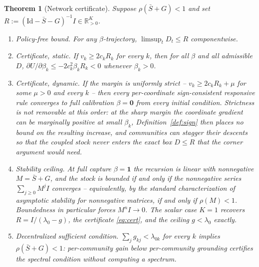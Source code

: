 \documentclass[11pt]{article}
\newtheorem{theorem}{Theorem}[section]
\theoremstyle{definition}
\theoremstyle{remark}
\numberwithin{equation}{section}
\newcommand{\R}{\mathbb{R}}
\begin{document}
\begin{theorem}[Network certificate]\label{thm:network}
Suppose $\rho(\bar S+G)<1$ and set $R:=(\mathrm{Id}-\bar S-G)^{-1}I\in\R^K_{>0}$.
\begin{enumerate}
\item[(i)] \emph{Policy-free bound.} For any $\beta$-trajectory, $\limsup_t D_t\le R$ componentwise.
\item[(ii)] \emph{Certificate, static.} If $v_k\ge 2c_kR_k$ for every $k$, then for all $\beta$ and all admissible $D$, $\partial U/\partial\beta_k\le-2c_k^2\beta_kR_k<0$ whenever $\beta_k>0$.
\item[(ii$'$)] \emph{Certificate, dynamic.} If the margin is \emph{uniformly strict} -- $v_k\ge 2c_kR_k+\mu$ for some $\mu>0$ and every $k$ -- then every per-coordinate sign-consistent responsive rule converges to full calibration $\beta=\mathbf{0}$ from every initial condition. Strictness is not removable at this order: at the sharp margin the coordinate gradient can be marginally positive at small $\beta_k$, Definition~\ref{def:sign} then places no bound on the resulting increase, and communities can stagger their descents so that the coupled stock never enters the exact box $D\le R$ that the corner argument would need.
\item[(iii)] \emph{Stability ceiling.} At full capture $\beta=\mathbf{1}$ the recursion is linear with nonnegative $M=\bar S+G$, and the stock is bounded if and only if the nonnegative series $\sum_{j\ge0}M^jI$ converges -- equivalently, by the standard characterization of asymptotic stability for nonnegative matrices, if and only if $\rho(M)<1$. Boundedness in particular forces $M^nI\to0$. The scalar case $K=1$ recovers $R=I/(\lambda_0-g)$, the certificate \eqref{eq:cert}, and the ceiling $g<\lambda_0$ exactly.
\item[(iv)] \emph{Decentralized sufficient condition.} $\sum_j g_{kj}<\lambda_{0k}$ for every $k$ implies $\rho(\bar S+G)<1$: per-community gain below per-community grounding certifies the spectral condition without computing a spectrum.
\end{enumerate}
\end{theorem}
\end{document}
